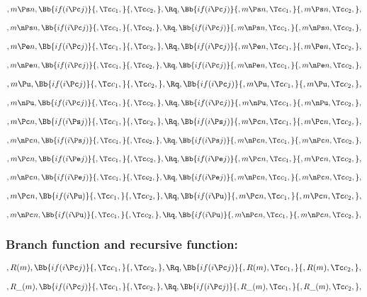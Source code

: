 \[,m \Ps n, \Bb{if(i \Pc j)}{,\Tc c_1,}{,\Tc c_2,}, \Rq , \Bb{if(i \Pc j)}{,m \Ps n,\Tc c_1,}{,m \Ps n,\Tc c_2,},\]
\bigskip
\bigskip

\[,m \nPs n, \Bb{if(i \Pc j)}{,\Tc c_1,}{,\Tc c_2,}, \Rq , \Bb{if(i \Pc j)}{,m \nPs n,\Tc c_1,}{,m \nPs n,\Tc c_2,},\]
\bigskip
\bigskip

\[,m \Pe n, \Bb{if(i \Pc j)}{,\Tc c_1,}{,\Tc c_2,}, \Rq , \Bb{if(i \Pc j)}{,m \Pe n,\Tc c_1,}{,m \Pe n,\Tc c_2,},\]
\bigskip
\bigskip

\[,m \nPe n, \Bb{if(i \Pc j)}{,\Tc c_1,}{,\Tc c_2,}, \Rq , \Bb{if(i \Pc j)}{,m \nPe n,\Tc c_1,}{,m \nPe n,\Tc c_2,},\]
\bigskip
\bigskip

\[,m \Pu, \Bb{if(i \Pc j)}{,\Tc c_1,}{,\Tc c_2,}, \Rq , \Bb{if(i \Pc j)}{,m \Pu,\Tc c_1,}{,m \Pu,\Tc c_2,},\]
\bigskip
\bigskip

\[,m \nPu, \Bb{if(i \Pc j)}{,\Tc c_1,}{,\Tc c_2,}, \Rq , \Bb{if(i \Pc j)}{,m \nPu,\Tc c_1,}{,m \nPu,\Tc c_2,},\]
\bigskip
\bigskip


\[,m \Pc n, \Bb{if(i \Ps j)}{,\Tc c_1,}{,\Tc c_2,}, \Rq , \Bb{if(i \Ps j)}{,m \Pc n,\Tc c_1,}{,m \Pc n,\Tc c_2,},\]
\bigskip
\bigskip

\[,m \nPc n, \Bb{if(i \Ps j)}{,\Tc c_1,}{,\Tc c_2,}, \Rq , \Bb{if(i \Ps j)}{,m \nPc n,\Tc c_1,}{,m \nPc n,\Tc c_2,},\]
\bigskip
\bigskip

\[,m \Pc n, \Bb{if(i \Pe j)}{,\Tc c_1,}{,\Tc c_2,}, \Rq , \Bb{if(i \Pe j)}{,m \Pc n,\Tc c_1,}{,m \Pc n,\Tc c_2,},\]
\bigskip
\bigskip

\[,m \nPc n, \Bb{if(i \Pe j)}{,\Tc c_1,}{,\Tc c_2,}, \Rq , \Bb{if(i \Pe j)}{,m \nPc n,\Tc c_1,}{,m \nPc n,\Tc c_2,},\]
\bigskip
\bigskip

\[,m \Pc n, \Bb{if(i \Pu)}{,\Tc c_1,}{,\Tc c_2,}, \Rq , \Bb{if(i \Pu)}{,m \Pc n,\Tc c_1,}{,m \Pc n,\Tc c_2,},\]
\bigskip
\bigskip

\[,m \nPc n, \Bb{if(i \Pu)}{,\Tc c_1,}{,\Tc c_2,}, \Rq , \Bb{if(i \Pu)}{,m \nPc n,\Tc c_1,}{,m \nPc n,\Tc c_2,},\]
\bigskip
\bigskip

\bigskip
\bigskip
\bigskip
\bigskip
\subsubsection{Branch function and recursive function:}
\[,R(m), \Bb{if(i \Pc j)}{,\Tc c_1,}{,\Tc c_2,}, \Rq , \Bb{if(i \Pc j)}{,R(m),\Tc c_1,}{,R(m),\Tc c_2,},\]
\bigskip
\bigskip

\[,R\_(m), \Bb{if(i \Pc j)}{,\Tc c_1,}{,\Tc c_2,}, \Rq , \Bb{if(i \Pc j)}{,R\_(m),\Tc c_1,}{,R\_(m),\Tc c_2,},\]
\bigskip
\bigskip


